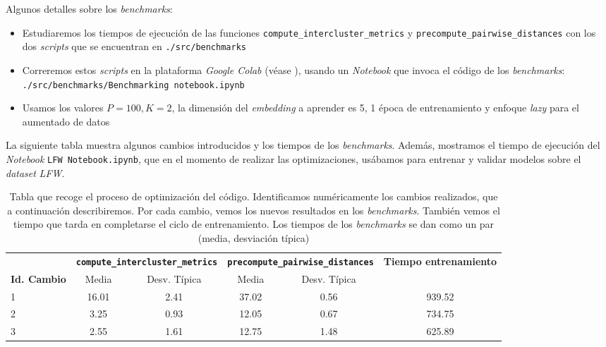 Algunos detalles sobre los \textit{benchmarks}:

\begin{itemize}
    \item Estudiaremos los tiempos de ejecución de las funciones \lstinline{compute_intercluster_metrics} y \lstinline{precompute_pairwise_distances} con los dos \textit{scripts} que se encuentran en \lstinline{./src/benchmarks}
    \item Correremos estos \textit{scripts} en la plataforma \textit{Google Colab} (véase ), usando un \textit{Notebook} que invoca el código de los \textit{benchmarks}: \lstinline{./src/benchmarks/Benchmarking notebook.ipynb}
    \item Usamos los valores $P = 100, K = 2$, la dimensión del \textit{embedding} a aprender es 5, 1 época de entrenamiento y enfoque \textit{lazy} para el aumentado de datos
\end{itemize}

La siguiente tabla muestra algunos cambios introducidos y los tiempos de los \textit{benchmarks}. Además, mostramos el tiempo de ejecución del \textit{Notebook} \lstinline{LFW Notebook.ipynb}, que en el momento de realizar las optimizaciones, usábamos para entrenar y validar modelos sobre el \textit{dataset} \textit{LFW}.

\begin{table}[H]
    \centering
    \begin{tabular}{lccccc}
        \toprule
        \textbf{} & \multicolumn{2}{c}{\textbf{\lstinline|compute_intercluster_metrics|}} & \multicolumn{2}{c}{\textbf{\lstinline|precompute_pairwise_distances|}} & \textbf{Tiempo entrenamiento} \\
        \cmidrule(lr){2-3} \cmidrule(lr){4-5}
        \textbf{Id. Cambio} & Media & Desv. Típica & Media & Desv. Típica & \\
        \midrule
        1 & 16.01 & 2.41 & 37.02 & 0.56 & 939.52 \\
        2 &  3.25 & 0.93  & 12.05 & 0.67 & 734.75  \\
        3 &  2.55 & 1.61  & 12.75 & 1.48 & 625.89  \\
        \bottomrule
    \end{tabular}
    \caption{Tabla que recoge el proceso de optimización del código. Identificamos numéricamente los cambios realizados, que a continuación describiremos. Por cada cambio, vemos los nuevos resultados en los \textit{benchmarks}. También vemos el tiempo que tarda en completarse el ciclo de entrenamiento. Los tiempos de los \textit{benchmarks} se dan como un par (media, desviación típica)}
\end{table}

